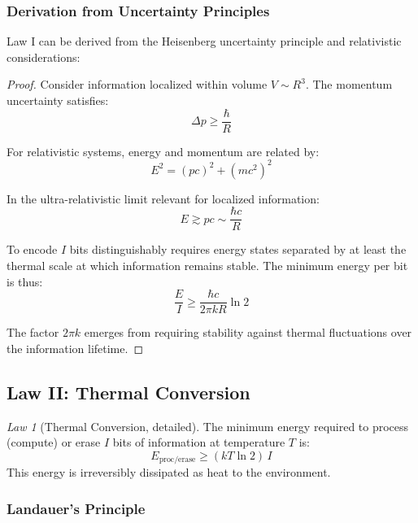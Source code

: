 \documentclass[11pt,a4paper]{article}
\theoremstyle{plain}
\theoremstyle{definition}
\theoremstyle{remark}
\newtheorem{law}{Law}
\begin{document}
\subsubsection{Derivation from Uncertainty Principles}

Law I can be derived from the Heisenberg uncertainty principle and relativistic considerations:

\begin{proof}
Consider information localized within volume $V \sim R^3$. The momentum uncertainty satisfies:
\begin{equation}
\Delta p \geq \frac{\hbar}{R}
\end{equation}

For relativistic systems, energy and momentum are related by:
\begin{equation}
E^2 = (pc)^2 + (mc^2)^2
\end{equation}

In the ultra-relativistic limit relevant for localized information:
\begin{equation}
E \gtrsim pc \sim \frac{\hbar c}{R}
\end{equation}

To encode $I$ bits distinguishably requires energy states separated by at least the thermal scale at which information remains stable. The minimum energy per bit is thus:
\begin{equation}
\frac{E}{I} \geq \frac{\hbar c}{2\pi k R}\ln 2
\end{equation}

The factor $2\pi k$ emerges from requiring stability against thermal fluctuations over the information lifetime.
\end{proof}

\subsection{Law II: Thermal Conversion}

\begin{law}[Thermal Conversion, detailed]
The minimum energy required to process (compute) or erase $I$ bits of information at temperature $T$ is:
\begin{equation}
E_{\text{proc/erase}} \geq (kT\ln 2)\,I
\label{eq:landauer_general}
\end{equation}
This energy is irreversibly dissipated as heat to the environment.
\end{law}

\subsubsection{Landauer's Principle}
\end{document}
